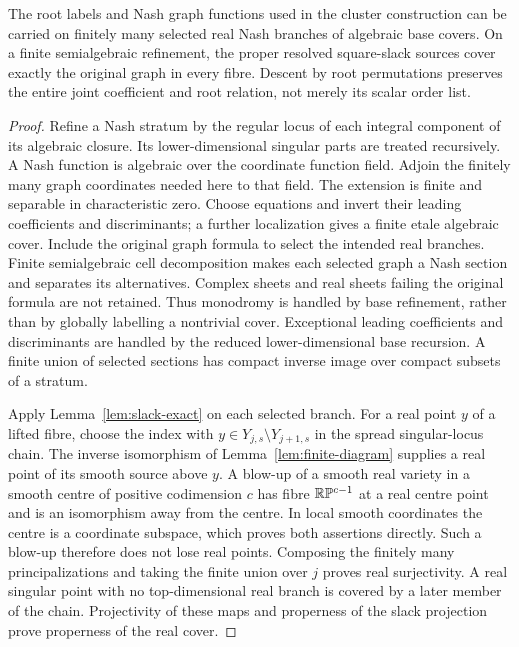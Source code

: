 \begin{lemma}\label{lem:real-descent}
The root labels and Nash graph functions used in the cluster construction
can be carried on finitely many selected real Nash branches of algebraic
base covers. On a finite semialgebraic refinement, the proper resolved
square-slack sources cover exactly the original graph in every fibre.
Descent by root permutations preserves the entire joint coefficient and
root relation, not merely its scalar order list.
\end{lemma}
\begin{proof}
Refine a Nash stratum by the regular locus of each integral component of
its algebraic closure. Its lower-dimensional singular parts are treated
recursively. A Nash function is algebraic over the coordinate function
field. Adjoin the finitely many graph coordinates needed here to that
field. The extension is finite and separable in characteristic zero.
Choose equations and invert their leading coefficients and discriminants;
a further localization gives a finite etale algebraic cover. Include the
original graph formula to select the intended real branches. Finite
semialgebraic cell decomposition makes each selected graph a Nash section
and separates its alternatives. Complex sheets and real sheets failing
the original formula are not retained. Thus monodromy is handled by base
refinement, rather than by globally labelling a nontrivial cover.
Exceptional leading coefficients and discriminants are handled by the
reduced lower-dimensional base recursion. A finite union of selected
sections has compact inverse image over compact subsets of a stratum.

Apply Lemma~\ref{lem:slack-exact} on each selected branch. For a real
point $y$ of a lifted fibre, choose the index with
$y\in Y_{j,s}\setminus Y_{j+1,s}$ in the spread singular-locus chain.
The inverse isomorphism of Lemma~\ref{lem:finite-diagram} supplies a real
point of its smooth source above $y$. A blow-up of a smooth real variety
in a smooth centre of positive codimension $c$ has fibre
$\mathbb R\mathbb P^{c-1}$ at a real centre point and is an isomorphism away
from the centre. In local smooth coordinates the centre is a coordinate
subspace, which proves both assertions directly. Such a blow-up therefore
does not lose real points. Composing the finitely many principalizations
and taking the finite union over $j$ proves real surjectivity. A real
singular point with no top-dimensional real branch is covered by a later
member of the chain. Projectivity of these maps and properness of the
slack projection prove properness of the real cover.


\end{proof}
